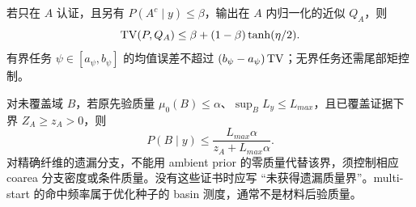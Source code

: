若只在 $A$ 认证，且另有 $P(A^c\mid y)\le\beta$，输出在 $A$ 内归一化的近似 $Q_A$，则
\begin{equation}
\operatorname{TV}(P,Q_A)\le\beta+(1-\beta)\tanh(\eta/2).
\end{equation}
有界任务 $\psi\in[a_\psi,b_\psi]$ 的均值误差不超过 $(b_\psi-a_\psi)\operatorname{TV}$；无界任务还需尾部矩控制。

对未覆盖域 $B$，若原先验质量 $\mu_0(B)\le\alpha$、$\sup_BL_y\le L_{max}$，且已覆盖证据下界 $Z_A\ge z_A>0$，则
\begin{equation}
P(B\mid y)\le\frac{L_{max}\alpha}{z_A+L_{max}\alpha}.\label{eq:omission}
\end{equation}
对精确纤维的遗漏分支，不能用 ambient prior 的零质量代替该界，须控制相应 coarea 分支密度或条件质量。没有这些证书时应写 ``未获得遗漏质量界''。multi-start 的命中频率属于优化种子的 basin 测度，通常不是材料后验质量。
